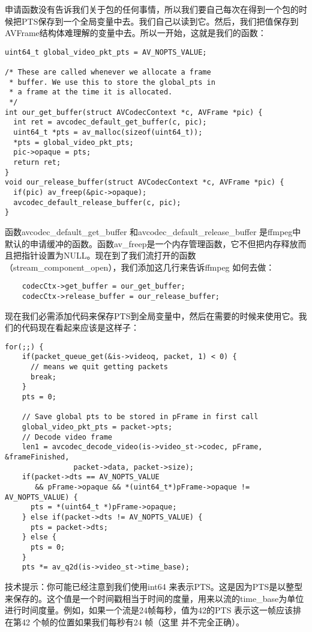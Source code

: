 申请函数没有告诉我们关于包的任何事情，所以我们要自己每次在得到一个包的时候把PTS保存到一个全局变量中去。我们自己以读到它。然后，我们把值保存到AVFrame结构体难理解的变量中去。所以一开始，这就是我们的函数：
\begin{lstlisting}
uint64_t global_video_pkt_pts = AV_NOPTS_VALUE;

/* These are called whenever we allocate a frame
 * buffer. We use this to store the global_pts in
 * a frame at the time it is allocated.
 */
int our_get_buffer(struct AVCodecContext *c, AVFrame *pic) {
  int ret = avcodec_default_get_buffer(c, pic);
  uint64_t *pts = av_malloc(sizeof(uint64_t));
  *pts = global_video_pkt_pts;
  pic->opaque = pts;
  return ret;
}
void our_release_buffer(struct AVCodecContext *c, AVFrame *pic) {
  if(pic) av_freep(&pic->opaque);
  avcodec_default_release_buffer(c, pic);
}
\end{lstlisting}

函数avcodec_default_get_buffer 和avcodec_default_release_buffer 是ffmpeg中默认的申请缓冲的函数。函数av_freep是一个内存管理函数，它不但把内存释放而且把指针设置为NULL。现在到了我们流打开的函数（stream_component_open），我们添加这几行来告诉ffmpeg 如何去做：

\begin{lstlisting}
    codecCtx->get_buffer = our_get_buffer;
    codecCtx->release_buffer = our_release_buffer;
\end{lstlisting}

现在我们必需添加代码来保存PTS到全局变量中，然后在需要的时候来使用它。我们的代码现在看起来应该是这样子：

\begin{lstlisting}
for(;;) {
    if(packet_queue_get(&is->videoq, packet, 1) < 0) {
      // means we quit getting packets
      break;
    }
    pts = 0;

    // Save global pts to be stored in pFrame in first call
    global_video_pkt_pts = packet->pts;
    // Decode video frame
    len1 = avcodec_decode_video(is->video_st->codec, pFrame, &frameFinished,
                packet->data, packet->size);
    if(packet->dts == AV_NOPTS_VALUE
       && pFrame->opaque && *(uint64_t*)pFrame->opaque != AV_NOPTS_VALUE) {
      pts = *(uint64_t *)pFrame->opaque;
    } else if(packet->dts != AV_NOPTS_VALUE) {
      pts = packet->dts;
    } else {
      pts = 0;
    }
    pts *= av_q2d(is->video_st->time_base);
\end{lstlisting}

技术提示：你可能已经注意到我们使用int64 来表示PTS。这是因为PTS是以整型来保存的。这个值是一个时间戳相当于时间的度量，用来以流的time_base为单位进行时间度量。例如，如果一个流是24帧每秒，值为42的PTS 表示这一帧应该排在第42 个帧的位置如果我们每秒有24 帧（这里 并不完全正确）。

